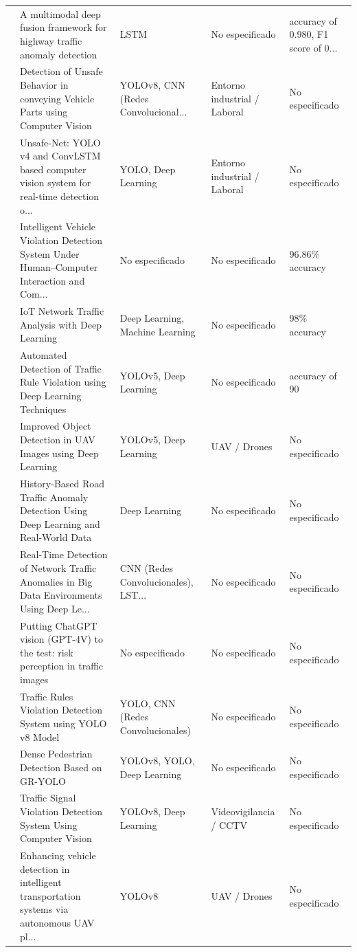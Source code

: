 \begin{table}[htbp]
\begin{tabular}{cp{7.5cm}p{2.8cm}p{2.8cm}p{2.8cm}}
\cite{duan2025multimodal} & A multimodal deep fusion framework for highway traffic anomaly detection & LSTM & No especificado & accuracy of 0.980, F1 score of 0... \\
\cite{vazquezmonjaras2024unsafe} & Detection of Unsafe Behavior in conveying Vehicle Parts using Computer Vision & YOLOv8, CNN (Redes Convolucional... & Entorno industrial / Laboral & No especificado \\
\cite{nal2024unsafenet} & Unsafe-Net: YOLO v4 and ConvLSTM based computer vision system for real-time detection o... & YOLO, Deep Learning & Entorno industrial / Laboral & No especificado \\
\cite{ren2024intelligent} & Intelligent Vehicle Violation Detection System Under Human–Computer Interaction and Com... & No especificado & No especificado & 96.86\% accuracy \\
\cite{liu2024network} & IoT Network Traffic Analysis with Deep Learning & Deep Learning, Machine Learning & No especificado & 98\% accuracy \\
\cite{thomas2024automated} & Automated Detection of Traffic Rule Violation using Deep Learning Techniques & YOLOv5, Deep Learning & No especificado & accuracy of 90 \\
\cite{poudel2024improved} & Improved Object Detection in UAV Images using Deep Learning & YOLOv5, Deep Learning & UAV / Drones & No especificado \\
\cite{michielsen2024historybased} & History-Based Road Traffic Anomaly Detection Using Deep Learning and Real-World Data & Deep Learning & No especificado & No especificado \\
\cite{arjunan2024realtime} & Real-Time Detection of Network Traffic Anomalies in Big Data Environments Using Deep Le... & CNN (Redes Convolucionales), LST... & No especificado & No especificado \\
\cite{driessen2024putting} & Putting ChatGPT vision (GPT-4V) to the test: risk perception in traffic images & No especificado & No especificado & No especificado \\
\cite{m2024traffic} & Traffic Rules Violation Detection System using YOLO v8 Model & YOLO, CNN (Redes Convolucionales) & No especificado & No especificado \\
\cite{li2024dense} & Dense Pedestrian Detection Based on GR-YOLO & YOLOv8, YOLO, Deep Learning & No especificado & No especificado \\
\cite{gehani2024traffic} & Traffic Signal Violation Detection System Using Computer Vision & YOLOv8, Deep Learning & Videovigilancia / CCTV & No especificado \\
\cite{bakirci2024enhancing} & Enhancing vehicle detection in intelligent transportation systems via autonomous UAV pl... & YOLOv8 & UAV / Drones & No especificado \\
\bottomrule
\end{tabular}
\end{table}


